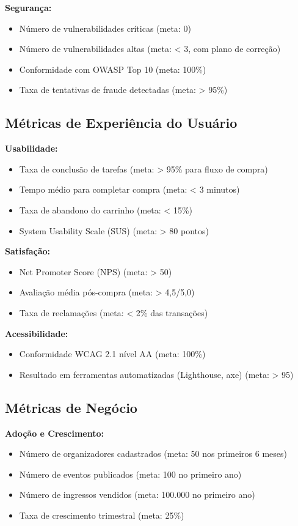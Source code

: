 \textbf{Segurança:}
\begin{itemize}
    \item Número de vulnerabilidades críticas (meta: 0)
    \item Número de vulnerabilidades altas (meta: < 3, com plano de correção)
    \item Conformidade com OWASP Top 10 (meta: 100\%)
    \item Taxa de tentativas de fraude detectadas (meta: > 95\%)
\end{itemize}

\subsection{Métricas de Experiência do Usuário}

\textbf{Usabilidade:}
\begin{itemize}
    \item Taxa de conclusão de tarefas (meta: > 95\% para fluxo de compra)
    \item Tempo médio para completar compra (meta: < 3 minutos)
    \item Taxa de abandono do carrinho (meta: < 15\%)
    \item System Usability Scale (SUS) (meta: > 80 pontos)
\end{itemize}

\textbf{Satisfação:}
\begin{itemize}
    \item Net Promoter Score (NPS) (meta: > 50)
    \item Avaliação média pós-compra (meta: > 4,5/5,0)
    \item Taxa de reclamações (meta: < 2\% das transações)
\end{itemize}

\textbf{Acessibilidade:}
\begin{itemize}
    \item Conformidade WCAG 2.1 nível AA (meta: 100\%)
    \item Resultado em ferramentas automatizadas (Lighthouse, axe) (meta: > 95)
\end{itemize}

\subsection{Métricas de Negócio}

\textbf{Adoção e Crescimento:}
\begin{itemize}
    \item Número de organizadores cadastrados (meta: 50 nos primeiros 6 meses)
    \item Número de eventos publicados (meta: 100 no primeiro ano)
    \item Número de ingressos vendidos (meta: 100.000 no primeiro ano)
    \item Taxa de crescimento trimestral (meta: 25\%)
\end{itemize}

